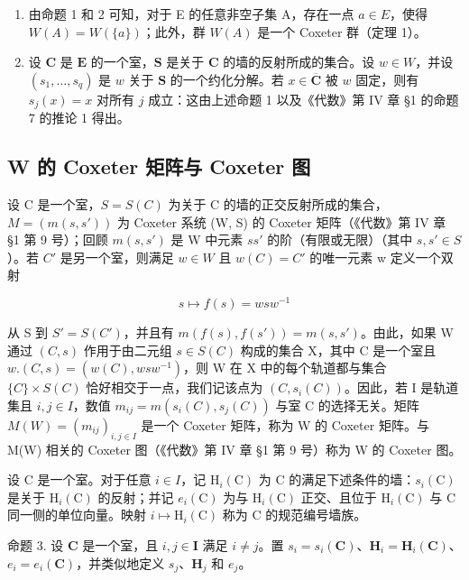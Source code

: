 \begin{enumerate}
\def\labelenumi{\arabic{enumi})}
\setcounter{enumi}{1}
\item
由命题 1 和 2 可知，对于 E 的任意非空子集 A，存在一点 \(a \in E\)，使得 \(W(A) = W(\{a\})\)；此外，群 \(W(A)\) 是一个 Coxeter 群（定理 1）。
\item
设 \(\mathbf{C}\) 是 \(\mathbf{E}\) 的一个室，\(\mathbf{S}\) 是关于 \(\mathbf{C}\) 的墙的反射所成的集合。设 \(w \in W\)，并设 \((s_1, \ldots, s_q)\) 是 \(w\) 关于 \(\mathbf{S}\) 的一个约化分解。若 \(x \in \overline{\mathbf{C}}\) 被 \(w\) 固定，则有 \(s_j(x) = x\) 对所有 \(j\) 成立：这由上述命题 1 以及《代数》第 IV 章 §1 的命题 7 的推论 1 得出。
\end{enumerate}

\subsection{W 的 Coxeter 矩阵与 Coxeter 图}

设 C 是一个室，\(S = S(C)\) 为关于 C 的墙的正交反射所成的集合，\(M = (m(s, s'))\) 为 Coxeter 系统 (W, S) 的 Coxeter 矩阵（《代数》第 IV 章 §1 第 9 号）；回顾 \(m(s, s')\) 是 W 中元素 \(ss'\) 的阶（有限或无限）（其中 \(s, s' \in S\)）。若 \(C'\) 是另一个室，则满足 \(w \in W\) 且 \(w(C) = C'\) 的唯一元素 w 定义一个双射

\[
s \mapsto f (s) = w s w ^ {- 1}
\]

从 S 到 \(S' = S(C')\)，并且有 \(m(f(s), f(s')) = m(s, s')\)。由此，如果 W 通过 \((C, s)\) 作用于由二元组 \(s \in S(C)\) 构成的集合 X，其中 C 是一个室且 \(w.(C, s) = (w(C), wsw^{-1})\)，则 W 在 X 中的每个轨道都与集合 \(\{C\} \times S(C)\) 恰好相交于一点，我们记该点为 \((C, s_i(C))\)。因此，若 I 是轨道集且 \(i, j \in I\)，数值 \(m_{ij} = m(s_i(C), s_j(C))\) 与室 C 的选择无关。矩阵 \(M(W) = (m_{ij})_{i,j \in I}\) 是一个 Coxeter 矩阵，称为 W 的 Coxeter 矩阵。与 M(W) 相关的 Coxeter 图（《代数》第 IV 章 §1 第 9 号）称为 W 的 Coxeter 图。

设 C 是一个室。对于任意 \(i \in I\)，记 \(\mathrm{H}_{i}(\mathrm{C})\) 为 C 的满足下述条件的墙：\(s_{i}(\mathrm{C})\) 是关于 \(\mathrm{H}_{i}(\mathrm{C})\) 的反射；并记 \(e_{i}(\mathrm{C})\) 为与 \(\mathrm{H}_{i}(\mathrm{C})\) 正交、且位于 \(\mathrm{H}_{i}(\mathrm{C})\) 与 C 同一侧的单位向量。映射 \(i \mapsto \mathrm{H}_{i}(\mathrm{C})\) 称为 C 的规范编号墙族。

命题 3. 设 \(\mathbf{C}\) 是一个室，且 \(i, j \in \mathbf{I}\) 满足 \(i \neq j\)。置 \(s_i = s_i(\mathbf{C})\)、\(\mathbf{H}_i = \mathbf{H}_i(\mathbf{C})\)、\(e_i = e_i(\mathbf{C})\)，并类似地定义 \(s_j\)、\(\mathbf{H}_j\) 和 \(e_j\)。

